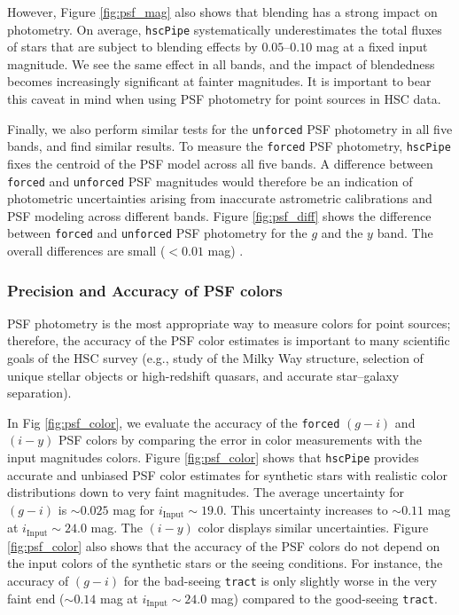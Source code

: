 \documentclass[useamsfonts]{pasj01}
\def\hscpipe{\texttt{hscPipe}}
\def\forced{\texttt{forced}}
\def\unforced{\texttt{unforced}}
\def\tract{\texttt{tract}}
\begin{document}
	However, Figure \ref{fig:psf_mag} also shows that blending has a strong impact on 
	photometry.  
	On average, \hscpipe{} systematically underestimates the total fluxes of stars 
	that are subject to blending effects by $0.05$--$0.10$ mag at a fixed input 
	magnitude.
    We see the same effect in all bands, and the impact of blendedness becomes
    increasingly significant at fainter magnitudes.
    It is important to bear this caveat in mind when using PSF photometry for point
    sources in HSC data.

	Finally, we also perform similar tests for the \unforced{} PSF photometry in all 
	five bands, and find similar results. 
	To measure the \forced{} PSF photometry, \hscpipe{} fixes the centroid of the PSF 
	model across all five bands. 
	A difference between \forced{} and \unforced{} PSF magnitudes would therefore be 
	an indication of photometric uncertainties arising from  inaccurate astrometric 
	calibrations and PSF modeling across different bands. 
	Figure \ref{fig:psf_diff} shows the difference between \forced{} and \unforced{} 
	PSF photometry for the $g$ and the $y$ band. 
	The overall differences are small ($<0.01$ mag) .

\subsubsection{Precision and Accuracy of PSF colors}

    PSF photometry is the most appropriate way to measure colors for point
    sources; therefore, the accuracy of the PSF color estimates is important to many 
    scientific goals of the HSC survey
    (e.g., study of the Milky Way structure, selection of unique stellar objects or
    high-redshift quasars, and accurate star--galaxy separation).

    In Fig \ref{fig:psf_color}, we evaluate the accuracy of the \forced{} $(g-i)$
    and $(i-y)$ PSF colors by comparing the error in color measurements with the input magnitudes colors. Figure  \ref{fig:psf_color} shows that \hscpipe{} provides accurate and unbiased PSF color
    estimates for synthetic stars with realistic color distributions down to very 
    faint magnitudes. The average uncertainty for $(g-i)$ is  ${\sim}0.025$ mag for $i_{\mathrm{Input}}{\sim}19.0$. This uncertainty increases to ${\sim}0.11$ mag at
    $i_{\mathrm{Input}}{\sim}24.0$ mag.  The $(i-y)$ color displays similar uncertainties. Figure \ref{fig:psf_color} also shows that the accuracy of the PSF colors do not depend on the input colors of the synthetic stars or the seeing conditions. For instance, the accuracy of $(g-i)$ for the bad-seeing \tract{} is only
    slightly worse in the very faint end (${\sim}0.14$ mag at
    $i_{\mathrm{Input}}{\sim}24.0$ mag) compared to the 
    good-seeing \tract{}.
\end{document}
